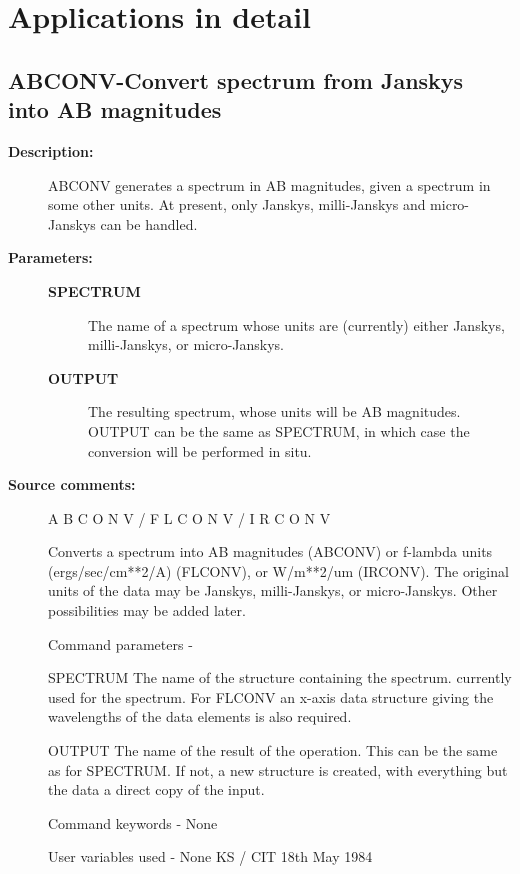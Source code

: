 \section{\label{applic}Applications in detail}
\subsection{ABCONV-\label{ABCONV}Convert spectrum from Janskys into AB magnitudes}
\begin{description}

\item [\textbf{Description:}]
 ABCONV generates a spectrum in AB magnitudes, given a spectrum in
 some other units.  At present, only Janskys, milli-Janskys and
 micro-Janskys can be handled.

\item [\textbf{Parameters:}]
\begin{description}
\item [\textbf{SPECTRUM}]
 The name of a spectrum whose units are (currently)
 either Janskys, milli-Janskys, or micro-Janskys.
\item [\textbf{OUTPUT}]
 The resulting spectrum, whose units will be AB magnitudes.
 OUTPUT can be the same as SPECTRUM, in which case the
 conversion will be performed in situ.
\end{description}

\item [\textbf{Source comments:}]
\begin{terminalv}
 A B C O N V  /  F L C O N V  /  I R C O N V

 Converts a spectrum into AB magnitudes (ABCONV) or f-lambda
 units (ergs/sec/cm**2/A) (FLCONV), or W/m**2/um (IRCONV).
 The original units of the
 data may be Janskys, milli-Janskys, or micro-Janskys.  Other
 possibilities may be added later.

 Command parameters -

 SPECTRUM The name of the structure containing the spectrum.
          currently used for the spectrum.  For FLCONV
          an x-axis data structure giving the wavelengths of the
          data elements is also required.

 OUTPUT   The name of the result of the operation.  This can
          be the same as for SPECTRUM. If not, a new structure
          is created, with everything but the data a direct
          copy of the input.

 Command keywords  - None

 User variables used - None
                                  KS / CIT 18th May 1984
\end{terminalv}
\end{description}
